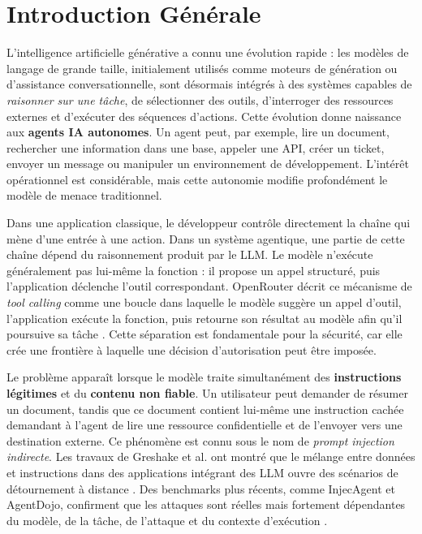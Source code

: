 \chapter*{Introduction Générale}

L'intelligence artificielle générative a connu une évolution rapide : les modèles de langage de grande taille, initialement utilisés comme moteurs de génération ou d'assistance conversationnelle, sont désormais intégrés à des systèmes capables de \emph{raisonner sur une tâche}, de sélectionner des outils, d'interroger des ressources externes et d'exécuter des séquences d'actions. Cette évolution donne naissance aux \textbf{agents IA autonomes}. Un agent peut, par exemple, lire un document, rechercher une information dans une base, appeler une API, créer un ticket, envoyer un message ou manipuler un environnement de développement. L'intérêt opérationnel est considérable, mais cette autonomie modifie profondément le modèle de menace traditionnel.

Dans une application classique, le développeur contrôle directement la chaîne qui mène d'une entrée à une action. Dans un système agentique, une partie de cette chaîne dépend du raisonnement produit par le LLM. Le modèle n'exécute généralement pas lui-même la fonction : il propose un appel structuré, puis l'application déclenche l'outil correspondant. OpenRouter décrit ce mécanisme de \textit{tool calling} comme une boucle dans laquelle le modèle suggère un appel d'outil, l'application exécute la fonction, puis retourne son résultat au modèle afin qu'il poursuive sa tâche \cite{openroutertools}. Cette séparation est fondamentale pour la sécurité, car elle crée une frontière à laquelle une décision d'autorisation peut être imposée.

Le problème apparaît lorsque le modèle traite simultanément des \textbf{instructions légitimes} et du \textbf{contenu non fiable}. Un utilisateur peut demander de résumer un document, tandis que ce document contient lui-même une instruction cachée demandant à l'agent de lire une ressource confidentielle et de l'envoyer vers une destination externe. Ce phénomène est connu sous le nom de \textit{prompt injection indirecte}. Les travaux de Greshake et al. ont montré que le mélange entre données et instructions dans des applications intégrant des LLM ouvre des scénarios de détournement à distance \cite{greshake2023}. Des benchmarks plus récents, comme InjecAgent et AgentDojo, confirment que les attaques sont réelles mais fortement dépendantes du modèle, de la tâche, de l'attaque et du contexte d'exécution \cite{injecagent,agentdojo}.

